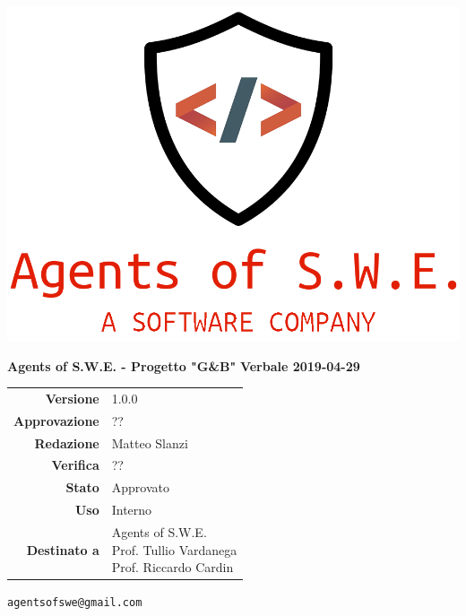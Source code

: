


\begin{titlepage}
\thispagestyle{empty}

\begin{center}

\includegraphics[scale=0.3]{./images/logo.png} 




\large \textbf{Agents of S.W.E. - Progetto "G\&B"}
\vfill
\Huge \textbf{Verbale 2019-04-29}
\vfill
\large
\renewcommand{\arraystretch}{1.3}
\begin{tabular}{r|l}
\textbf{Versione} & 1.0.0\\
\textbf{Approvazione} & {??}\\
\textbf{Redazione} & \parbox[t]{5cm}{Matteo Slanzi}\\
\textbf{Verifica} & \parbox[t]{5cm}{??}\\
\textbf{Stato} & Approvato\\
\textbf{Uso} & Interno\\
\textbf{Destinato a} & \parbox[t]{5cm}{Agents of S.W.E. \\Prof. Tullio Vardanega\\Prof. Riccardo Cardin}
\end{tabular}
\vfill
\small
\texttt{agentsofswe@gmail.com}
\end{center}
\end{titlepage}

\pagebreak



\pagebreak


\pagebreak


\pagebreak








